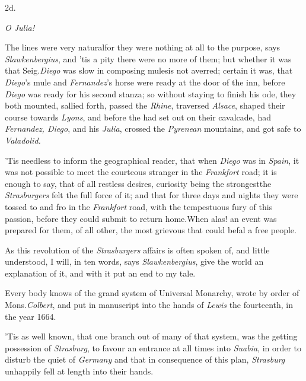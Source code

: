 \documentclass{article}
\begin{document}
\medskip
\centerline{2d.}
\parskip
\bgroup\itshape\small\noindent
\null\qquad O Julia!
\par\egroup
{}
\newpage
The lines were very natural\tsk for they were nothing
at all to the purpose, says \textit{Slawkenbergius}, and ’tis a
pity there were no more of them; but whether it was that
Seig.\@ \textit{Diego} was slow in composing  mules\tsk is not averred; certain it
was, that \textit{Diego}’s mule and \textit{Fernandez}’s
horse were ready at the door of the inn, before \textit{Diego} was
ready for his second stanza; so without staying to finish his ode,
they both mounted, sallied forth, passed the \textit{Rhine}, traversed
\textit{Alsace}, shaped their\break 
course towards \textit{Lyons}, and before the\break
{} had
set out on their cavalcade, had \textit{Fernandez, Diego}, and his
\textit{Julia}, crossed the \textit{Pyrenean} mountains, and got safe
to\break
\textit{Valadolid.}

\newpage
’Tis needless to inform the geographical reader, that when
\textit{Diego} was in \textit{Spain}, it was not possible to meet the
courteous stranger in the \textit{Frankfort} road; it is enough to
say, that of all restless desires, curiosity being the
strongest\tsk the \textit{Strasburgers} felt the full force
of it; and that for three days and nights they were tossed to and
fro in the \textit{Frankfort} road, with the tempestuous fury of this
passion, before they could submit to return home.\tsk When
alas! an event was prepared for them, of all other, the most
grievous that could befal a free people.

As this revolution of the \textit{Strasburgers} affairs is often
spoken of, and little understood, I will, in ten words, says
\textit{Slawkenbergius}, give the world an explanation of it, and with it put an end to my tale.

\newpage
Every body knows of the grand system of Universal Monarchy,
wrote by\break
order of Mons.\@ \textit{Colbert}, and put in ma\-nuscript into
the hands of \textit{Lewis} the fourteenth, in the year 1664.

’Tis as well known, that one branch out of many of that
system, was the\break
getting possession of \textit{Strasburg}, to favour
an entrance at all times into \textit{Suabia}, in\break
order to disturb the quiet of \textit{Germany}\tsh\break
and that in consequence of this plan,\break
\textit{Strasburg} unhappily fell at length into their
hands.
\end{document}
